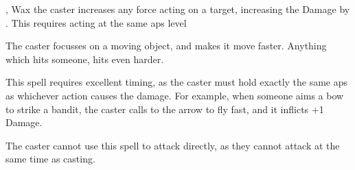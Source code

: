   {\mEarth,\mFire}%
  {Wax}%
  {}%
  {}%
  {the caster increases any force acting on a target, increasing the Damage by . This requires acting at the same \glspl{ap} level}%
  {
    The caster focusses on a moving object, and makes it move faster.
    Anything which hits someone, hits even harder.

    This spell requires excellent timing, as the caster must hold exactly the same \glspl{ap} as whichever action causes the damage.
    For example, when someone aims a bow to strike a bandit, the caster calls to the arrow to fly fast, and it inflicts +1 Damage.

    The caster cannot use this spell to attack directly, as they cannot attack at the same time as casting.
  }
